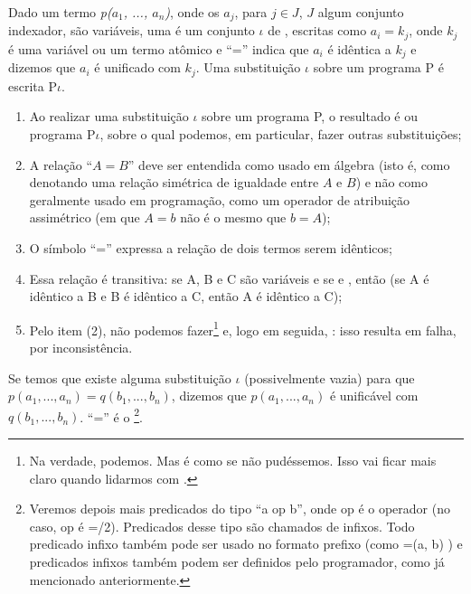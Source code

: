 \documentclass{article}
\begin{document}

\begin{definition} Dado um termo {\it p($a_1$, ..., $a_n$)}, onde os $a_j$, para $j \in J$, $J$ algum conjunto indexador, são variáveis, uma  é um conjunto $\iota$ de , escritas como $a_i = k_j$, onde $k_j$ é uma variável ou um termo atômico e ``='' indica que $a_i$ é idêntica a $k_j$ e dizemos que $a_i$ é unificado com $k_j$.
  Uma substituição $\iota$ sobre um programa P é escrita P$\iota$.
\end{definition}

\begin{remark}
  \hfill
  \begin{enumerate}
    \item Ao realizar uma substituição $\iota$ sobre um programa P, o resultado é ou programa P$\iota$, sobre o qual podemos, em particular, fazer outras substituições;
    \item A relação ``$A = B$'' deve ser entendida como usado em álgebra (isto é, como denotando uma relação simétrica de igualdade entre $A$ e $B$) e não como geralmente usado em programação, como um operador de atribuição assimétrico (em que $A = b$ não é o mesmo que $b = A$);
    \item O símbolo ``='' expressa a relação de dois termos serem idênticos;
    \item Essa relação é transitiva: se A, B e C são variáveis e se  e , então  (se A é idêntico a B e B é idêntico a C, então A é idêntico a C);
    \item Pelo item (2), não podemos fazer\footnote{Na verdade, podemos. Mas é como se não pudéssemos. Isso vai ficar mais claro quando lidarmos com .}  e, logo em seguida, : isso resulta em falha, por inconsistência.
  \end{enumerate}
\end{remark}

Se temos que existe alguma substituição $\iota$ (possivelmente vazia) para que $p(a_1, ..., a_n) = q(b_1, ..., b_n)$, dizemos que  $p(a_1, ..., a_n)$ é unificável com $q(b_1, ..., b_n)$. ``='' é o \footnote{Veremos depois mais
  predicados do tipo ``a op b'', onde op é o operador (no caso, op é =/2). Predicados desse tipo são chamados de infixos. Todo predicado infixo também pode ser usado no formato prefixo (como =(a, b) ) e predicados infixos também podem ser definidos pelo programador, como já mencionado anteriormente.}.
\end{document}
